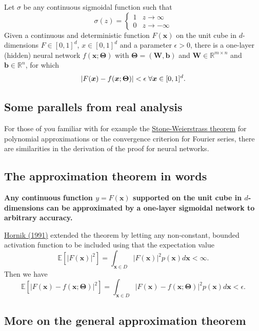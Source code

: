 \documentclass[%
oneside,                 %
final,                   %
10pt]{article}
\begin{document}
\begin{block}{}
Let $\sigma$ be any continuous sigmoidal function such that
\[
\sigma(z) = \left\{\begin{array}{cc} 1 & z\rightarrow \infty\\ 0 & z \rightarrow -\infty \end{array}\right.
\]
Given a continuous and deterministic function $F(\bm{x})$ on the unit
cube in $d$-dimensions $F\in [0,1]^d$, $x\in [0,1]^d$ and a parameter
$\epsilon >0$, there is a one-layer (hidden) neural network
$f(\bm{x};\bm{\Theta})$ with $\bm{\Theta}=(\bm{W},\bm{b})$ and $\bm{W}\in
\mathbb{R}^{m\times n}$ and $\bm{b}\in \mathbb{R}^{n}$, for which
\[
\vert F(\bm{x})-f(\bm{x};\bm{\Theta})\vert < \epsilon \hspace{0.1cm} \forall \bm{x}\in[0,1]^d.
\]

\end{block}

\subsection{Some parallels from real analysis}

For those of you familiar with for example the \href{{https://en.wikipedia.org/wiki/Stone%E2%80%93Weierstrass_theorem}}{Stone-Weierstrass
theorem}
for polynomial approximations or the convergence criterion for Fourier
series, there are similarities in the derivation of the proof for
neural networks. 

\subsection{The approximation theorem in words}

\textbf{Any continuous function $y=F(\bm{x})$ supported on the unit cube in
$d$-dimensions can be approximated by a one-layer sigmoidal network to
arbitrary accuracy.}

\href{{https://www.sciencedirect.com/science/article/abs/pii/089360809190009T}}{Hornik (1991)} extended the theorem by letting any non-constant, bounded activation function to be included using that the expectation value
\[
\mathbb{E}[\vert F(\bm{x})\vert^2] =\int_{\bm{x}\in D} \vert F(\bm{x})\vert^2p(\bm{x})d\bm{x} < \infty.
\]
Then we have
\[
\mathbb{E}[\vert F(\bm{x})-f(\bm{x};\bm{\Theta})\vert^2] =\int_{\bm{x}\in D} \vert F(\bm{x})-f(\bm{x};\bm{\Theta})\vert^2p(\bm{x})d\bm{x} < \epsilon.
\]

\subsection{More on the general approximation theorem}
\end{document}
